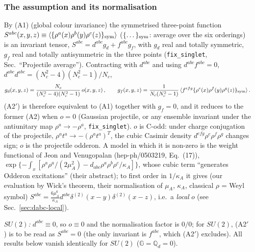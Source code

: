 \documentclass[10pt]{article}
\def\mf#1{\mathbb{#1}}
\begin{document}
\subsubsection{The assumption and its normalisation}\label{sec:dabc-ass}
\noindent By (A1) (global colour invariance) the symmetrised three-point function $S^{abc}(x,y,z)\equiv\langle\{\rho^{a}(x)\rho^{b}(y)\rho^{c}(z)\}_{\rm sym}\rangle$ ($\{\dots\}_{\rm sym}$: average over the six orderings) is an invariant tensor, $S^{abc}=d^{abc}g_{d}+f^{abc}g_{f}$, with $g_{d}$ real and totally symmetric, $g_{f}$ real and totally antisymmetric in the three points (\texttt{fix\_singlet}, Sec.~``Projectile average''). Contracting with $d^{abc}$ and using $d^{abc}f^{abc}=0$, $d^{abc}d^{abc}=(N_{c}^{2}-4)(N_{c}^{2}-1)/N_{c}$,
\begin{align}
g_{d}(x,y,z)=\frac{N_{c}}{(N_{c}^{2}-4)(N_{c}^{2}-1)}\,o(x,y,z)\,,\qquad g_{f}(x,y,z)=\frac{1}{N_{c}(N_{c}^{2}-1)}\,\langle f^{efg}\{\rho^{e}(x)\rho^{f}(y)\rho^{g}(z)\}_{\rm sym}\rangle\,.\label{eq:dabc-gdgf}
\end{align}
(A2$'$) is therefore equivalent to (A1) together with $g_{f}=0$, and it reduces to the former (A2) when $o=0$ (Gaussian projectile, or any ensemble invariant under the antiunitary map $\rho^{a}\to-\rho^{a}$, \texttt{fix\_singlet}). $o$ is C-odd: under charge conjugation of the projectile, $\rho^{a}t^{a}\to-(\rho^{a}t^{a})^{T}$, the cubic Casimir density $d^{efg}\rho^{e}\rho^{f}\rho^{g}$ changes sign; $o$ is the projectile odderon. A model in which it is non-zero is the weight functional of Jeon and Venugopalan (hep-ph/0503219, Eq.~(17)), $\exp\{-\int_{x}[\rho^{a}\rho^{a}/(2\mu_{A}^{2})-d_{abc}\rho^{a}\rho^{b}\rho^{c}/\kappa_{A}]\}$, whose cubic term ``generates Odderon excitations'' (their abstract); to first order in $1/\kappa_{A}$ it gives (our evaluation by Wick's theorem, their normalisation of $\mu_{A}$, $\kappa_{A}$, classical $\rho$ = Weyl symbol) $S^{abc}=\frac{6\mu_{A}^{6}}{\kappa_{A}}d^{abc}\delta^{(2)}(x-y)\delta^{(2)}(x-z)$, i.e.\ a \emph{local} $o$ (see Sec.~\ref{sec:dabc-local}).\par
\noindent\emph{$SU(2)$:} $d^{abc}\equiv0$, so $o\equiv0$ and the normalisation factor is $0/0$; for $SU(2)$, (A2$'$) is to be read as $S^{abc}=0$ (the only invariant is $f^{abc}$, which (A2$'$) excludes). All results below vanish identically for $SU(2)$ ($\mf{G}=\mf{Q}_{d}=0$).
\end{document}
